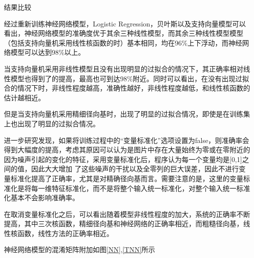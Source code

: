 \documentclass[UTF8,a4paper]{ctexart}
\begin{document}
结果比较

经过重新训练神经网络模型，Logistic Regression，贝叶斯以及支持向量模型可以看出，神经网络模型的准确度优于其余三种线性模型，而其余三种线性模型模型（包括支持向量机采用线性核函数的时）基本相同，均在96\%上下浮动，而神经网络模型可以达到98\%以上。

当支持向量机采用非线性模型且没有出现明显的过拟合的情况下，其正确率相对线性模型也得到了的提高，最高也可到达98\%附近。同时可以看出，在没有出现过拟合的情况下时，非线性程度越高，准确性越好，非线性程度越低，和线性核函数的估计越相近。

但是当支持向量机采用精细径向基时，出现了明显的过拟合情况，即使是在训练集上也出现了明显的过拟合情况。


进一步研究发现，如果将训练过程中的“变量标准化”选项设置为false，则准确率会得到大幅度的提高，考虑其原因可以认为是图片中存在大量始终为零或在零附近的因为噪声引起的变化的特征，采用变量标准化后，程序认为每一个变量均是[0,1]之间的值，因此大大增加 了这些噪声的干扰以及全零列的巨大误差，因此不进行变量标准化提高了正确率，尤其是对精确径向基而言。需要注意的是，这里的变量标准化是将每一维特征标准化，而不是将整个输入统一标准化，对整个输入统一标准化基本不会影响准确率。

在取消变量标准化之后，可以看出随着模型非线性程度的加大，系统的正确率不断提高，其中三次核函数，精细径向基和神经网络的正确率相近，而粗糙径向基，线性核函数，线性方法的正确率相近。

神经网络模型的混淆矩阵附加如图\ref{NN},\ref{TNN}所示
\end{document}
